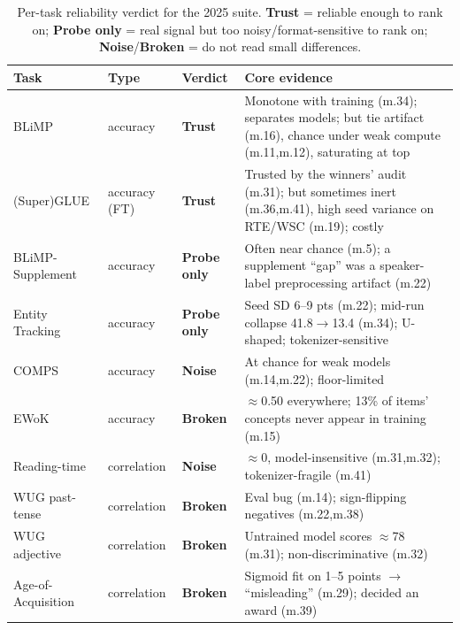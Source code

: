 \documentclass[11pt]{article}
\newcommand{\trust}{\textcolor{green!55!black}{\textbf{Trust}}}
\newcommand{\probe}{\textcolor{orange!85!black}{\textbf{Probe only}}}
\newcommand{\noise}{\textcolor{red!75!black}{\textbf{Noise}}}
\newcommand{\broken}{\textcolor{red!75!black}{\textbf{Broken}}}
\begin{document}
\begin{table}[h]
\centering\small
\renewcommand{\arraystretch}{1.25}
\begin{tabular}{@{}l l l p{6.4cm}@{}}
\toprule
\textbf{Task} & \textbf{Type} & \textbf{Verdict} & \textbf{Core evidence}\\
\midrule
BLiMP            & accuracy    & \trust   & Monotone with training (m.34); separates models; but tie artifact (m.16), chance under weak compute (m.11,m.12), saturating at top\\
(Super)GLUE      & accuracy (FT)& \trust  & Trusted by the winners' audit (m.31); but sometimes inert (m.36,m.41), high seed variance on RTE/WSC (m.19); costly\\
BLiMP-Supplement & accuracy    & \probe   & Often near chance (m.5); a supplement ``gap'' was a speaker-label preprocessing artifact (m.22)\\
Entity Tracking  & accuracy    & \probe   & Seed SD 6--9 pts (m.22); mid-run collapse 41.8$\to$13.4 (m.34); U-shaped; tokenizer-sensitive\\
COMPS            & accuracy    & \noise   & At chance for weak models (m.14,m.22); floor-limited\\
EWoK             & accuracy    & \broken  & $\approx$0.50 everywhere; 13\% of items' concepts never appear in training (m.15)\\
Reading-time     & correlation & \noise   & $\approx$0, model-insensitive (m.31,m.32); tokenizer-fragile (m.41)\\
WUG past-tense   & correlation & \broken  & Eval bug (m.14); sign-flipping negatives (m.22,m.38)\\
WUG adjective    & correlation & \broken  & Untrained model scores $\approx$78 (m.31); non-discriminative (m.32)\\
Age-of-Acquisition& correlation& \broken  & Sigmoid fit on 1--5 points $\to$ ``misleading'' (m.29); decided an award (m.39)\\
\bottomrule
\end{tabular}
\caption{Per-task reliability verdict for the 2025 suite. \trust{} = reliable enough to rank
on; \probe{} = real signal but too noisy/format-sensitive to rank on; \noise{}/\broken{} = do
not read small differences.}
\label{tab:verdict}
\end{table}
\end{document}
